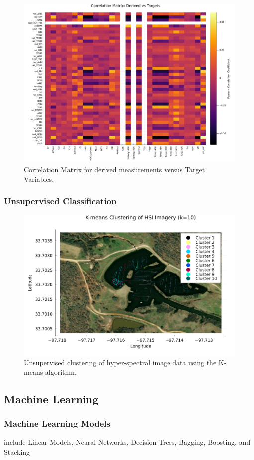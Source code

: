 \documentclass[remotesensing,article,submit,pdftex,moreauthors]{Definitions/mdpi}
\begin{document}
\begin{figure}[H]
\includegraphics[width=10.5 cm]{images/correlation/derived_cor.png}
\caption{Correlation Matrix for derived measurements versus Target Variables.\label{derived_cor}}
\end{figure}   


\subsubsection{Unsupervised Classification}
\begin{figure}[H]
\includegraphics[width=11 cm]{images/unsupervised/clustering.png}
\caption{Unsupervised clustering of hyper-spectral image data using the K-means algorithm.\label{clustering}}
\end{figure}   


\subsection{Machine Learning}



\subsubsection{Machine Learning Models}
include Linear Models, Neural Networks, Decision Trees, Bagging, Boosting, and Stacking\\
\end{document}
